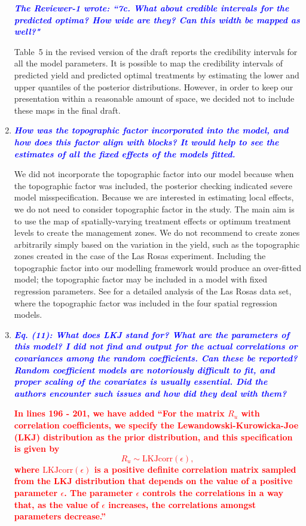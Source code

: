 \documentclass[a4paper]{article}   	%
\newcommand{\qtitle}[1]{\textit{\textbf{#1}}}
\begin{document}
\begin{enumerate}
      \qtitle{\textcolor{blue}{The Reviewer-1 wrote: ``7c. What about credible intervals for the predicted optima? How wide are they? Can this width be mapped as well?"}}
     
     Table~5 in the revised version of the draft reports the credibility intervals for all the model parameters. It is possible to map the credibility intervals of predicted yield and predicted optimal treatments by estimating the lower and upper quantiles of the posterior distributions. However, in order to keep our presentation within a reasonable amount of space, we decided not to include these maps in the final draft.

    \item \qtitle{\textcolor{blue}{How was the topographic factor incorporated into the model, and how does this factor align with blocks? It would help to see the estimates of all the fixed effects of the models fitted.}}

    We did not incorporate the topographic factor into our model because when the topographic factor was included, the posterior checking indicated severe model misspecification. Because we are interested in estimating local effects, we do not need to consider topographic factor in the study. The main aim is to use the map of spatially-varying treatment effects or optimum treatment levels to create the management zones. We do not recommend to create zones arbitrarily simply based on the variation in the yield, such as the topographic zones created in the case of the Las Rosas experiment. Including the topographic factor into our modelling framework would produce an over-fitted model; the topographic factor may be included in a model with fixed regression parameters. See \cite{lambert2004comparison} for a detailed analysis of the Las Rosas data set, where the topographic factor was included in the four spatial regression models.

    \item \qtitle{\textcolor{blue}{Eq. (11): What does LKJ stand for? What are the parameters of this model? I did not find and output for the actual correlations or covariances among the random coefficients. Can these be reported? Random coefficient models are notoriously difficult to fit, and proper scaling of the covariates is usually essential. Did the authors encounter such issues and how did they deal with them?}}

    \textcolor{red}{\textbf{In lines 196 - 201, we have added ``For the matrix $R_u$ with correlation coefficients, we specify the Lewandowski-Kurowicka-Joe (LKJ) distribution \parencite{Lewandowski2009Generating} as the prior distribution, and this specification is given by
	\begin{equation}\label{eq:RPrior}
		R_u \sim \text{LKJcorr}(\epsilon),
	\end{equation}
	where $\text{LKJcorr}(\epsilon)$ is a positive definite correlation matrix sampled from the LKJ distribution that depends on the value of a positive parameter $\epsilon$. The parameter $\epsilon$ controls the correlations in a way that, as the value of $\epsilon$ increases, the correlations amongst parameters decrease.''}}
    

\end{enumerate}
\end{document}
